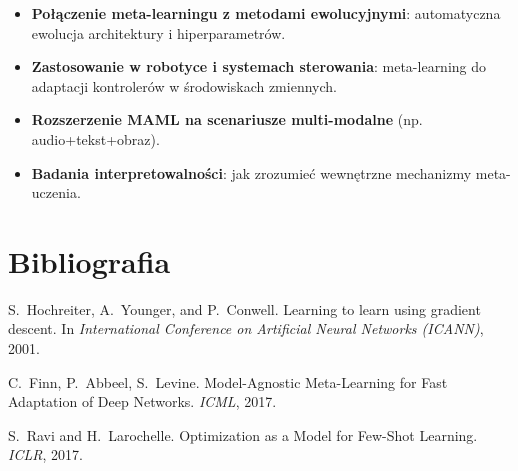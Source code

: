 \documentclass[12pt,a4paper]{article}
\begin{document}
\begin{itemize}
    \item \textbf{Połączenie meta-learningu z metodami ewolucyjnymi}: automatyczna ewolucja architektury i hiperparametrów.
    \item \textbf{Zastosowanie w robotyce i systemach sterowania}: meta-learning do adaptacji kontrolerów w środowiskach zmiennych.
    \item \textbf{Rozszerzenie MAML na scenariusze multi-modalne} (np. audio+tekst+obraz).
    \item \textbf{Badania interpretowalności}: jak zrozumieć wewnętrzne mechanizmy meta-uczenia.
\end{itemize}

\section*{Bibliografia}

\begin{thebibliography}{9}

S.~Hochreiter, A.~Younger, and P.~Conwell.
\newblock Learning to learn using gradient descent.
\newblock In \emph{International Conference on Artificial Neural Networks (ICANN)}, 2001.

C.~Finn, P.~Abbeel, S.~Levine.
\newblock Model-Agnostic Meta-Learning for Fast Adaptation of Deep Networks.
\newblock \emph{ICML}, 2017.

S.~Ravi and H.~Larochelle.
\newblock Optimization as a Model for Few-Shot Learning.
\newblock \emph{ICLR}, 2017.

\end{thebibliography}
\end{document}
